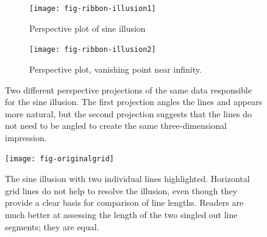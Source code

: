 \documentclass[11pt]{isuthesis}\usepackage[]{graphicx}\usepackage[]{color}
\begin{document}


% 

\begin{figure}[h!tbp]\centering

\begin{subfigure}[t]{.49\linewidth}\centering
\texttt{[image: fig-ribbon-illusion1]}
\caption{Perspective plot of sine illusion\label{ribbon1}}
\end{subfigure}
\begin{subfigure}[t]{.49\linewidth}\centering
\texttt{[image: fig-ribbon-illusion2]}
\caption{Perspective plot, vanishing point near infinity.\label{ribbon2}}
\end{subfigure}
\caption[Three-dimensional origins of the sine illusion]{Two different perspective projections of the same data responsible for the sine illusion. The first projection angles the lines and appears more natural, but the second projection suggests that the lines do not need to be angled to create the same three-dimensional impression.\label{ribbon}}
\end{figure}




\begin{figure}
\centering
\texttt{[image: fig-originalgrid]}
\caption[Contextual origins of the sine illusion]{\label{fig:original-grid} The sine illusion with two individual lines highlighted. Horizontal grid lines do not help  to resolve the illusion, even though they provide a clear basis for comparison of line lengths. Readers are much better at assessing the length of the two singled out line segments; they are equal.}
\end{figure}
\end{document}
